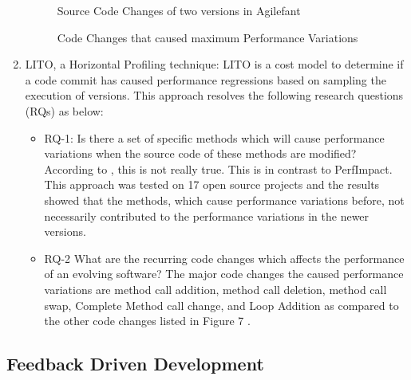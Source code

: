 \documentclass[article,type=msc,colorback,12pt,accentcolor=tud7b]{tudthesis}
\begin{document}
\begin{enumerate}
 \begin{figure}
 \begin{center}
  \makebox[\textwidth]{\texttt{[image: B1]}}
  \makebox[\textwidth]{\texttt{[image: B2]}}
\end{center}
\caption{Source Code Changes of two versions in Agilefant \cite{luomining}}
\end{figure}

 \begin{figure}
 \begin{center}
  \makebox[\textwidth]{\texttt{[image: B3]}}
\end{center}
\caption{Code Changes that caused maximum Performance Variations \cite{sandoval2016learning}}
\end{figure}

\item{LITO, a Horizontal Profiling technique:} 
LITO is a cost model to determine if a code commit has caused performance regressions based on sampling the execution of versions. This approach resolves the following research questions (RQs) as below:

\begin{itemize}

\item RQ-1: Is there a set of specific methods which will cause performance variations when the source code of these methods are modified? According to \cite{sandoval2016learning}, this is not really true. This is in contrast to PerfImpact. This approach was tested on 17 open source projects and the results showed that the methods, which cause performance variations before, not necessarily contributed to the performance variations in the newer versions.

\item RQ-2  What are the recurring code changes which affects the performance of an evolving software? The major code changes the caused performance variations are method call addition, method call deletion, method call swap, Complete Method call change, and Loop Addition  as compared to the other code changes listed in Figure 7 \cite{sandoval2016learning}.

\end{itemize}
\end{enumerate}	

	\subsection{Feedback Driven Development } 		
	
\end{document}
